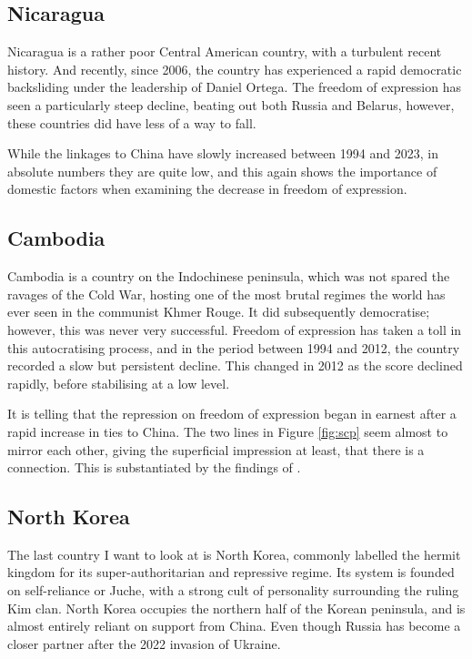 \subsection{Nicaragua}
Nicaragua is a rather poor Central American country, with a turbulent recent history. And recently, since 2006, the country has experienced a rapid democratic backsliding under the leadership of Daniel Ortega. The freedom of expression has seen a particularly steep decline, beating out both Russia and Belarus, however, these countries did have less of a way to fall.

While the linkages to China have slowly increased between 1994 and 2023, in absolute numbers they are quite low, and this again shows the importance of domestic factors when examining the decrease in freedom of expression.

\subsection{Cambodia}
Cambodia is a country on the Indochinese peninsula, which was not spared the ravages of the Cold War, hosting one of the most brutal regimes the world has ever seen in the communist Khmer Rouge. It did subsequently democratise; however, this was never very successful. Freedom of expression has taken a toll in this autocratising process, and in the period between 1994 and 2012, the country recorded a slow but persistent decline. This changed in 2012 as the score declined rapidly, before stabilising at a low level.

It is telling that the repression on freedom of expression began in earnest after a rapid increase in ties to China. The two lines in Figure \ref{fig:scp} seem almost to mirror each other, giving the superficial impression at least, that there is a connection. This is substantiated by the findings of \citet{loughlin_chinese_2021}.

\subsection{North Korea}
The last country I want to look at is North Korea, commonly labelled the hermit kingdom for its super-authoritarian and repressive regime. Its system is founded on self-reliance or Juche, with a strong cult of personality surrounding the ruling Kim clan. North Korea occupies the northern half of the Korean peninsula, and is almost entirely reliant on support from China. Even though Russia has become a closer partner after the 2022 invasion of Ukraine. 


